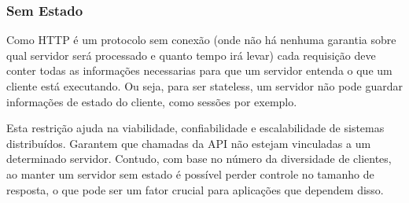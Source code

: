 \subsubsection[Sem Estado]{Sem Estado}

Como HTTP é um protocolo sem conexão (onde não há nenhuma garantia sobre qual servidor será processado e quanto tempo irá levar) cada requisição deve conter todas as informações necessarias para que um servidor entenda o que um cliente está executando. Ou seja, para ser stateless, um servidor não pode guardar informações de estado do cliente, como sessões por exemplo. \cite{Fielding2000}

Esta restrição ajuda na viabilidade, confiabilidade e escalabilidade de sistemas distribuídos. Garantem que chamadas da API não estejam vinculadas a um determinado servidor. Contudo, com base no número da diversidade de clientes, ao manter um servidor sem estado é possível perder controle no tamanho de resposta, o que pode ser um fator crucial para aplicações que dependem disso. \cite{Wildermuth2015}
